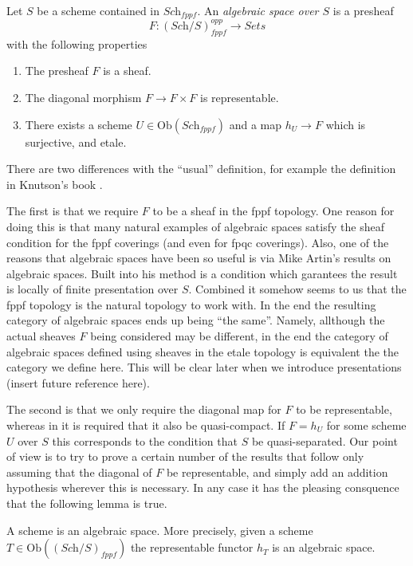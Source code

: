 \begin{definition}
\label{definition-algebraic-space}
Let $S$ be a scheme contained in $\textit{Sch}_{fppf}$.
An {\it algebraic space over $S$} is a presheaf
$$
F : (\textit{Sch}/S)^{opp}_{fppf} \longrightarrow \textit{Sets}
$$
with the following properties
\begin{enumerate}
\item The presheaf $F$ is a sheaf.
\item The diagonal morphism $F  \to F \times F$ is representable.
\item There exists a scheme $U \in \text{Ob}(\textit{Sch}_{fppf})$
and a map $h_U \to F$ which is surjective, and etale.
\end{enumerate}
\end{definition}

\noindent
There are two differences with the ``usual'' definition, for example the
definition in Knutson's book \cite{Kn}.

\medskip\noindent
The first is that we require $F$ to be a sheaf in the fppf topology.
One reason for doing this is that many natural examples
of algebraic spaces satisfy the sheaf condition for the fppf coverings
(and even for fpqc coverings). Also, one of the reasons that algebraic
spaces have been so useful is via Mike Artin's results on algebraic spaces.
Built into his method is a condition which garantees the result is
locally of finite presentation over $S$.
Combined it somehow seems to us that the fppf topology
is the natural topology to work with. In the end the resulting category
of algebraic spaces ends up being ``the same''. Namely, allthough the actual
sheaves $F$ being considered may be different, in the end the
category of algebraic spaces defined using sheaves in the etale topology
is equivalent the the category we define here. This will be clear later
when we introduce presentations (insert future reference here).

\medskip\noindent
The second is that we only require the diagonal map for $F$ to be
representable, whereas in \cite{Kn} it is required that it also
be quasi-compact. If $F = h_U$ for some scheme $U$ over $S$
this corresponds to the condition that $S$ be quasi-separated.
Our point of view is to try to prove a certain
number of the results that follow only assuming that the diagonal
of $F$ be representable, and simply add an addition hypothesis wherever
this is necessary. In any case it has the pleasing consquence that
the following lemma is true.

\begin{lemma}
\label{lemma-scheme-is-space}
A scheme is an algebraic space. More precisely,
given a scheme $T \in \text{Ob}((\textit{Sch}/S)_{fppf})$
the representable functor $h_T$ is an algebraic space.
\end{lemma}

